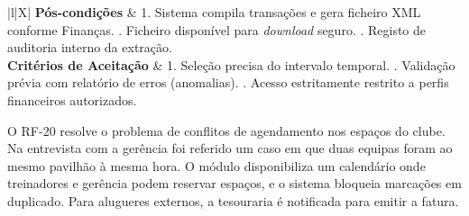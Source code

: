 {\begin{xltabular}{\textwidth}{|l|X|}
\textbf{Pós-condições} & 1. Sistema compila transações e gera ficheiro XML conforme Finanças. . Ficheiro disponível para \textit{download} seguro. . Registo de auditoria interno da extração. \\ \hline
\textbf{Critérios de Aceitação} & 1. Seleção precisa do intervalo temporal. . Validação prévia com relatório de erros (anomalias). . Acesso estritamente restrito a perfis financeiros autorizados. \\
\end{xltabular}
}


O RF-20 resolve o problema de conflitos de agendamento nos espaços do clube. Na entrevista com a gerência foi referido um caso em que duas equipas foram ao mesmo pavilhão à mesma hora. O módulo disponibiliza um calendário onde treinadores e gerência podem reservar espaços, e o sistema bloqueia marcações em duplicado. Para alugueres externos, a tesouraria é notificada para emitir a fatura.

